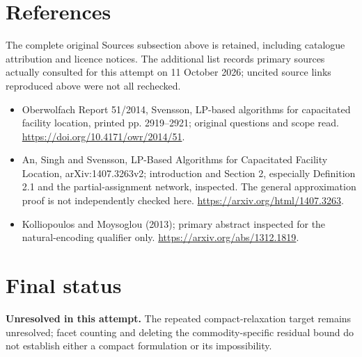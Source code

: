 \documentclass[11pt]{article}
\begin{document}
\section{References}
The complete original Sources subsection above is retained, including catalogue attribution and licence notices. The additional list records primary sources actually consulted for this attempt on 11 October 2026; uncited source links reproduced above were not all rechecked.
\begin{itemize}
\item Oberwolfach Report 51/2014, Svensson, LP-based algorithms for capacitated facility location, printed pp. 2919--2921; original questions and scope read. \url{https://doi.org/10.4171/owr/2014/51}.
\item An, Singh and Svensson, LP-Based Algorithms for Capacitated Facility Location, arXiv:1407.3263v2; introduction and Section 2, especially Definition 2.1 and the partial-assignment network, inspected. The general approximation proof is not independently checked here. \url{https://arxiv.org/html/1407.3263}.
\item Kolliopoulos and Moysoglou (2013); primary abstract inspected for the natural-encoding qualifier only. \url{https://arxiv.org/abs/1312.1819}.
\end{itemize}
\section{Final status}
\textbf{Unresolved in this attempt.} The repeated compact-relaxation target remains unresolved; facet counting and deleting the commodity-specific residual bound do not establish either a compact formulation or its impossibility.
\end{document}
